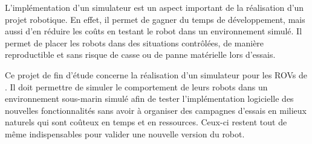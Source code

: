 L'implémentation d'un simulateur est un aspect important de la réalisation d'un projet robotique. En effet, il permet de gagner du temps de développement, mais aussi d'en réduire les coûts en testant le robot dans un environnement simulé. Il permet de placer les robots dans des situations contrôlées, de manière reproductible et sans risque de casse ou de panne matérielle lors d'essais.

Ce projet de fin d'étude concerne la réalisation d'un simulateur pour les \gls{ROV}s de \forssea{}. Il doit permettre de simuler le comportement de leurs robots dans un environnement sous-marin simulé afin de tester l'implémentation logicielle des nouvelles fonctionnalités sans avoir à organiser des campagnes d'essais en milieux naturels qui sont coûteux en temps et en ressources. Ceux-ci restent tout de même indispensables pour valider une nouvelle version du robot.
